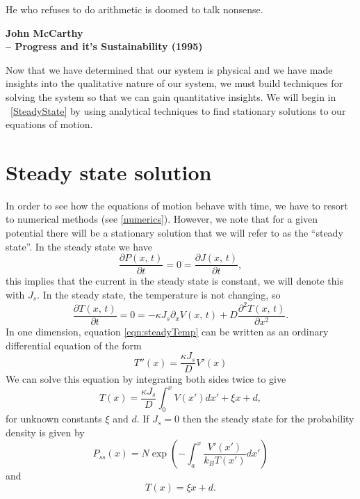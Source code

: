 \epigraph{He who refuses to do arithmetic is doomed to talk nonsense.}{\textbf{John McCarthy \\ -- Progress and it's Sustainability (1995)}}
Now that we have determined that our system is physical and we have made insights into the qualitative nature of our system, we must build techniques for solving the system so that we can gain quantitative insights. We will begin in ~\autoref{SteadyState} by using analytical techniques to find stationary solutions to our equations of motion.
\section{Steady state solution} \label{SteadyState}
In order to see how the equations of motion behave with time, we have to resort to numerical methods (see \autoref{numerics}). However, we note that for a given potential there will be a stationary solution that we will refer to as the ``steady state''. In the steady state we have
\begin{equation}
\frac{\partial P(x, \, t)}{\partial t} = 0 = \frac{\partial J(x, \, t)}{\partial t},
\end{equation}
this implies that the current in the steady state is constant, we will denote this with $J_s$. In the steady state, the temperature is not changing, so
\begin{equation}
\frac{\partial T(x, \, t)}{\partial t} = 0 = -\kappa J_s \partial_x V(x, \, t) + D \frac{\partial^2 T(x, \, t)}{\partial x^2}. \label{eqn:steadyTemp}
\end{equation}
In one dimension, equation \ref{eqn:steadyTemp} can be written as an ordinary differential equation of the form
\begin{equation}
T''(x) = \frac{\kappa J_s}{D} V'(x)
\end{equation}
We can solve this equation by integrating both sides twice to give
\begin{equation}
T(x) = \frac{\kappa J_s}{D} \int_0^x V(x') dx' + \xi x + d, \label{eqn:steadyTemperature}
\end{equation}
for unknown constants $\xi$ and $d$. If $J_s = 0$ then the steady state for the probability density is given by
\begin{equation}
P_{ss}(x) = N \exp{\left(-\int_a^x \frac{V'(x')}{k_B T(x')} dx' \right)}
\end{equation}
and
\begin{equation}
T(x) = \xi x + d.
\end{equation}
